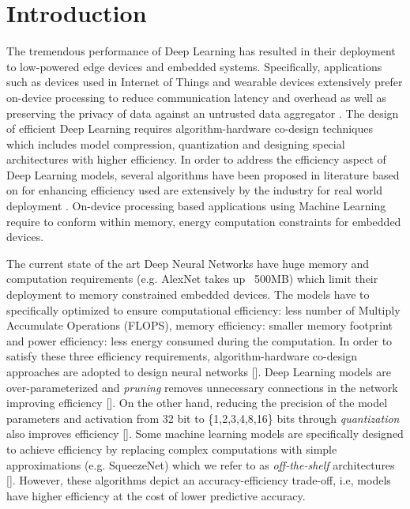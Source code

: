 \section{Introduction}\label{introduction}

The tremendous performance of Deep Learning has resulted in their deployment to low-powered edge devices and embedded systems.
Specifically, applications such as devices used in Internet of Things and wearable devices extensively prefer on-device processing to reduce communication latency and overhead as well as preserving the privacy of data against an untrusted data aggregator \cite{8110880}.
The design of efficient Deep Learning requires algorithm-hardware co-design techniques which includes model compression, quantization and designing special architectures with higher efficiency.
In order to address the efficiency aspect of Deep Learning models, several algorithms have been proposed in literature based on  for enhancing efficiency used are extensively by the industry for real world deployment \cite{8114708}.
On-device processing based applications using Machine Learning require to conform within memory, energy computation constraints for embedded devices.

The current state of the art Deep Neural Networks have huge memory and computation requirements (e.g. AlexNet takes up ~500MB) which limit their deployment to memory constrained embedded devices.
The models have to specifically optimized to ensure computational efficiency: less number of Multiply Accumulate Operations (FLOPS), memory efficiency: smaller memory footprint and power efficiency: less energy consumed during the computation.
In order to satisfy these three efficiency requirements,  algorithm-hardware co-design approaches are adopted to design neural networks [].
Deep Learning models are over-parameterized and \textit{pruning} removes unnecessary connections in the network improving efficiency [].
On the other hand, reducing the precision of the model parameters and activation from 32 bit to \{1,2,3,4,8,16\} bits through \textit{quantization} also improves efficiency [].
Some machine learning models are specifically designed to achieve efficiency by replacing complex computations with simple approximations (e.g. SqueezeNet) which we refer to as \textit{off-the-shelf} architectures [].
However, these algorithms depict an accuracy-efficiency trade-off, i.e, models have higher efficiency at the cost of lower predictive accuracy.

